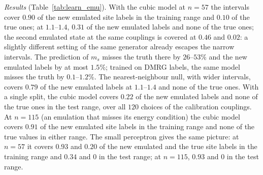 \documentclass[aps,prx,onecolumn,10pt,nofootinbib,longbibliography,floatfix]{revtex4-2}
\theoremstyle{remark}
\newcommand{\ms}{m_s}
\begin{document}
\emph{Results} (Table~\ref{tab:learn_emu}). With the cubic model at $n=57$ the intervals cover $0.90$ of the new %
emulated site labels in the training range and $0.10$ of the true ones; at $1.1$--$1.4$, $0.31$ of the new emulated %
labels and none of the true ones; the second emulated state at the same couplings is covered at $0.46$ and $0.02$: %
a slightly different setting of the same generator already escapes the narrow intervals. The prediction of $\ms$
misses the truth there by $26$--$53\%$ and the new emulated labels by at most $1.5\%$; trained on DMRG labels, the same %
model misses the truth by $0.1$--$1.2\%$. The nearest-neighbour null, with wider intervals, covers $0.79$ of the new %
emulated labels at $1.1$--$1.4$ and none of the true ones. With a single split, the cubic model covers $0.22$ of the %
new emulated labels and none of the true ones in the test range, over all $120$ choices of the calibration %
couplings. At $n=115$ (an emulation that misses its energy condition) the cubic model covers $0.91$ of the new emulated %
site labels in the training range and none of the true values in either range.
The small perceptron gives the same picture: at $n=57$ it covers $0.93$ and $0.20$ of the new emulated and the true %
site labels in the training range and $0.34$ and $0$ in the test range; at $n=115$, $0.93$ and $0$ in the test range. %
\end{document}
